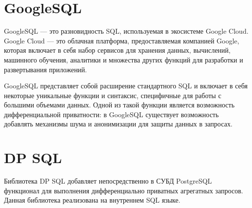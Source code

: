 \section{GoogleSQL}
GoogleSQL --- это разновидность SQL, используемая в экосистеме Google Cloud.
Google Cloud --- это облачная платформа, предоставляемая компанией Google, которая включает в себя набор сервисов для хранения данных, вычислений, машинного обучения, аналитики и множества других функций для разработки и развертывания приложений.~\cite{googlecloud2023}

GoogleSQL представляет собой расширение стандартного SQL и включает в себя некоторые уникальные функции и синтаксис, специфичные для работы с большими объемами данных.
Одной из такой функции является возможность дифференциальной приватности: в GoogleSQL существует возможность добавлять механизмы шума и анонимизации для защиты данных в запросах.~\cite{googlecloud2023}

\section{DP SQL}
Библиотека DP SQL добавляет непосредственно в СУБД PostgreSQL функционал для выполнения дифференциально приватных агрегатных запросов.
Данная библиотека реализована на внутреннем SQL языке.~\cite{DPSQL}
